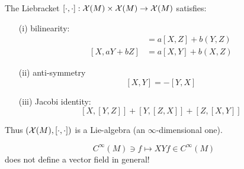 \begin{remark}
    The Liebracket \([\cdot,\cdot]:\mathcal{X}(M)\times \mathcal{X}(M)\to \mathcal{X}(M)\) satisfies:
    \begin{enumerate}
        \item[(i)] bilinearity: \begin{align*}
            [aX+bY,Z] &= a[X,Z]+b(Y,Z)\\
            [X,aY+bZ]&=  a[X,Y]+b(X,Z)
        \end{align*} 
        \item[(ii)] anti-symmetry \[[X,Y]=-[Y,X]\]
        \item[(iii)] Jacobi identity: \[[X,[Y,Z]]+[Y,[Z,X]]+[Z,[X,Y]]\] 
    \end{enumerate}
    Thus \((\mathcal{X}(M),[\cdot,\cdot])\) is a Lie-algebra (an \(\infty\)-dimensional one).
\end{remark}


\[C^\infty(M)\ni f\mapsto XY f\in C^\infty(M)\] 
does not define a vector field in general!
